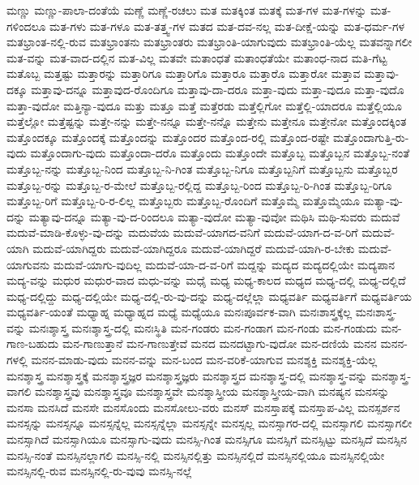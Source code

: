 {ಮಣ್ಣು
ಮಣ್ಣು-ಪಾಲಾ-ದಂತೆಯೆ
ಮಣ್ಣೆ
ಮಣ್ಣೆ-ರಚಲು
ಮತ
ಮತಕ್ಕಿಂತ
ಮತಕ್ಕೆ
ಮತ-ಗಳ
ಮತ-ಗಳನ್ನು
ಮತ-ಗಳಿಂದಲೂ
ಮತ-ಗಳು
ಮತ-ಗಳೂ
ಮತ-ತತ್ತ್ವ-ಗಳ
ಮತದ
ಮತ-ದವ-ನಲ್ಲ
ಮತ-ದೀಕ್ಷೆ-ಯನ್ನು
ಮತ-ಧರ್ಮ-ಗಳ
ಮತಭ್ರಾಂತ-ನಲ್ಲಿ-ರುವ
ಮತಭ್ರಾಂತನು
ಮತಭ್ರಾಂತರು
ಮತಭ್ರಾಂತಿ-ಯಾಗುವುದು
ಮತಭ್ರಾಂತಿ-ಯೆಲ್ಲ
ಮತವನ್ನಾಗಲೀ
ಮತ-ವನ್ನು
ಮತ-ವಾದ-ದಲ್ಲಿನ
ಮತ-ವಿಲ್ಲ
ಮತವೇ
ಮತಾಂಧತೆ
ಮತಾಂಧತೆಯೇ
ಮತಾಂಧ-ನಾದ
ಮತಿ-ಗೆಟ್ಟ
ಮತೊಬ್ಬ
ಮತ್ತಷ್ಟು
ಮತ್ತಾರನ್ನು
ಮತ್ತಾರಿಗೂ
ಮತ್ತಾರಿಗೊ
ಮತ್ತಾರೂ
ಮತ್ತಾರೊ
ಮತ್ತಾರೋ
ಮತ್ತಾವ
ಮತ್ತಾವು-ದಕ್ಕೂ
ಮತ್ತಾವು-ದನ್ನೂ
ಮತ್ತಾವುದ-ರೊಂದಿಗೂ
ಮತ್ತಾವು-ದಾ-ದರೂ
ಮತ್ತಾ-ವುದು
ಮತ್ತಾ-ವುದೂ
ಮತ್ತಾ-ವುದೊ
ಮತ್ತಾ-ವುದೋ
ಮತ್ತಿನ್ಯಾ-ವುದೂ
ಮತ್ತು
ಮತ್ತೂ
ಮತ್ತೆ
ಮತ್ತೆರಡು
ಮತ್ತೆಲ್ಲಿಗೋ
ಮತ್ತೆಲ್ಲಿ-ಯಾದರೂ
ಮತ್ತೆಲ್ಲಿಯೂ
ಮತ್ತೆಲ್ಲೋ
ಮತ್ತೆಷ್ಟನ್ನು
ಮತ್ತೇ-ನನ್ನು
ಮತ್ತೇ-ನನ್ನೂ
ಮತ್ತೇ-ನನ್ನೊ
ಮತ್ತೇನು
ಮತ್ತೇನೂ
ಮತ್ತೇನೋ
ಮತ್ತೊಂದಕ್ಕಿಂತ
ಮತ್ತೊಂದಕ್ಕೂ
ಮತ್ತೊಂದಕ್ಕೆ
ಮತ್ತೊಂದನ್ನು
ಮತ್ತೊಂದರ
ಮತ್ತೊಂದ-ರಲ್ಲಿ
ಮತ್ತೊಂದ-ರಷ್ಟೇ
ಮತ್ತೊಂದಾಗುತ್ತಿ-ರು-ವುದು
ಮತ್ತೊಂದಾಗು-ವುದು
ಮತ್ತೊಂದಾ-ದರೊ
ಮತ್ತೊಂದು
ಮತ್ತೊಂದೇ
ಮತ್ತೊಬ್ಬ
ಮತ್ತೊಬ್ಬನ
ಮತ್ತೊಬ್ಬ-ನಂತೆ
ಮತ್ತೊಬ್ಬ-ನನ್ನು
ಮತ್ತೊಬ್ಬ-ನಿಂದ
ಮತ್ತೊಬ್ಬ-ನಿ-ಗಿಂತ
ಮತ್ತೊಬ್ಬ-ನಿಗೂ
ಮತ್ತೊಬ್ಬನಿಗೆ
ಮತ್ತೊಬ್ಬನು
ಮತ್ತೊಬ್ಬರ
ಮತ್ತೊಬ್ಬ-ರನ್ನು
ಮತ್ತೊಬ್ಬ-ರ-ಮೇಲೆ
ಮತ್ತೊಬ್ಬ-ರಲ್ಲಿದ್ದ
ಮತ್ತೊಬ್ಬ-ರಿಂದ
ಮತ್ತೊಬ್ಬ-ರಿ-ಗಿಂತ
ಮತ್ತೊಬ್ಬ-ರಿಗೂ
ಮತ್ತೊಬ್ಬ-ರಿಗೆ
ಮತ್ತೊಬ್ಬ-ರಿ-ರ-ಲಿಲ್ಲ
ಮತ್ತೊಬ್ಬರು
ಮತ್ತೊಬ್ಬ-ರೊಂದಿಗೆ
ಮತ್ತೊಮ್ಮೆ
ಮತ್ತೊಮ್ಮೆಯೂ
ಮತ್ಯಾ-ವು-ದನ್ನು
ಮತ್ಯಾವು-ದನ್ನೂ
ಮತ್ಯಾ-ವು-ದ-ರಿಂದಲೂ
ಮತ್ಯಾ-ವುದೋ
ಮತ್ಯಾ-ವುವೋ
ಮಥಿಸಿ
ಮಥಿ-ಸುವರು
ಮದುವೆ
ಮದುವೆ-ಮಾಡಿ-ಕೊಳ್ಳು-ವು-ದನ್ನು
ಮದುವೆಯ
ಮದುವೆ-ಯಾಗದ-ವನಿಗೆ
ಮದುವೆ-ಯಾಗ-ದ-ವ-ರಿಗೆ
ಮದುವೆ-ಯಾಗಿ
ಮದುವೆ-ಯಾಗಿದ್ದರು
ಮದುವೆ-ಯಾಗಿದ್ದರೂ
ಮದುವೆ-ಯಾಗಿದ್ದರೆ
ಮದುವೆ-ಯಾಗಿ-ರ-ಬೇಕು
ಮದುವೆ-ಯಾಗುವನು
ಮದುವೆ-ಯಾಗು-ವುದಿಲ್ಲ
ಮದುವೆ-ಯಾ-ದ-ವ-ರಿಗೆ
ಮದ್ದನ್ನು
ಮದ್ಯದ
ಮದ್ಯದಲ್ಲಿಯೇ
ಮದ್ಯಪಾನ
ಮದ್ಯ-ವನ್ನು
ಮಧುರ
ಮಧುರ-ವಾದ
ಮಧು-ವನ್ನು
ಮಧೈ
ಮಧ್ಯ
ಮಧ್ಯ-ಕಾಲದ
ಮಧ್ಯದ
ಮಧ್ಯ-ದಲ್ಲಿ
ಮಧ್ಯ-ದಲ್ಲಿದೆ
ಮಧ್ಯ-ದಲ್ಲಿದ್ದು
ಮಧ್ಯ-ದಲ್ಲಿಯೇ
ಮಧ್ಯ-ದಲ್ಲಿ-ರು-ವು-ದನ್ನು
ಮಧ್ಯ-ದಲ್ಲೆಲ್ಲಾ
ಮಧ್ಯವರ್ತಿ
ಮಧ್ಯವರ್ತಿಗೆ
ಮಧ್ಯವರ್ತಿಯ
ಮಧ್ಯವರ್ತಿ-ಯಂತೆ
ಮಧ್ಯಾಹ್ನ
ಮಧ್ಯಾಹ್ನದ
ಮಧ್ಯೆ
ಮಧ್ಯೆಯೂ
ಮನಃಪೂರ್ವಕ-ವಾಗಿ
ಮನಃಶಾಸ್ತ್ರಕ್ಕೆಲ್ಲ
ಮನಃಶಾಸ್ತ್ರ-ವನ್ನು
ಮನಃಶ್ಶಾಸ್ತ್ರ
ಮನಃಶ್ಶಾಸ್ತ್ರ-ದಲ್ಲಿ
ಮನಃಸ್ಥಿತಿ
ಮನ-ಗಂಡರು
ಮನ-ಗಂಡಾಗ
ಮನ-ಗಂಡು
ಮನ-ಗಂಡುದು
ಮನ-ಗಾಣ-ಬಹುದು
ಮನ-ಗಾಣುತ್ತಾನೆ
ಮನ-ಗಾಣುತ್ತೇವೆ
ಮನದ
ಮನದಟ್ಟಾಗು-ವುದೋ
ಮನ-ದಣಿಯೆ
ಮನನ
ಮನನ-ಗಳಲ್ಲಿ
ಮನನ-ಮಾಡು-ವುದು
ಮನನ-ವನ್ನು
ಮನ-ಬಂದ
ಮನ-ವರಿಕೆ-ಯಾಗುವ
ಮನಶ್ಶಕ್ತಿ
ಮನಶ್ಶಕ್ತಿ-ಯೆಲ್ಲ
ಮನಶ್ಶಾಸ್ತ್ರ
ಮನಶ್ಶಾಸ್ತ್ರಕ್ಕೆ
ಮನಶ್ಶಾಸ್ತ್ರಜ್ಞರ
ಮನಶ್ಶಾಸ್ತ್ರಜ್ಞರು
ಮನಶ್ಶಾಸ್ತ್ರದ
ಮನಶ್ಶಾಸ್ತ್ರ-ದಲ್ಲಿ
ಮನಶ್ಶಾಸ್ತ್ರ-ವನ್ನು
ಮನಶ್ಶಾಸ್ತ್ರ-ವಾಗಲಿ
ಮನಶ್ಶಾಸ್ತ್ರವು
ಮನಶ್ಶಾಸ್ತ್ರವೂ
ಮನಶ್ಶಾಸ್ತ್ರವೇ
ಮನಶ್ಶಾಸ್ತ್ರೀಯ
ಮನಶ್ಶಾಸ್ತ್ರೀಯ-ವಾಗಿ
ಮನಷ್ಯನ
ಮನಸನ್ನು
ಮನಸಾ
ಮನಸಿದೆ
ಮನಸೇ
ಮನಸೊಂದು
ಮನಸೋಲು-ವರು
ಮನಸ್
ಮನಸ್ತಾಪಕ್ಕೆ
ಮನಸ್ತಾಪ-ವಿಲ್ಲ
ಮನಸ್ಪರ್ಶನ
ಮನಸ್ಸನ್ನು
ಮನಸ್ಸನ್ನೂ
ಮನಸ್ಸನ್ನೆಲ್ಲ
ಮನಸ್ಸನ್ನೆಲ್ಲಾ
ಮನಸ್ಸನ್ನೇ
ಮನಸ್ಸಲ್ಲ
ಮನಸ್ಸಾಗರ-ದಲ್ಲಿ
ಮನಸ್ಸಾಗಲಿ
ಮನಸ್ಸಾಗಲೀ
ಮನಸ್ಸಾಗಿದೆ
ಮನಸ್ಸಾಗಿಯೂ
ಮನಸ್ಸಾಗು-ವುದು
ಮನಸ್ಸಿ-ಗಿಂತ
ಮನಸ್ಸಿಗೂ
ಮನಸ್ಸಿಗೆ
ಮನಸ್ಸಿಟ್ಟು
ಮನಸ್ಸಿದೆ
ಮನಸ್ಸಿನ
ಮನಸ್ಸಿ-ನಂತೆ
ಮನಸ್ಸಿನಲ್ಲಾಗಲಿ
ಮನಸ್ಸಿ-ನಲ್ಲಿ
ಮನಸ್ಸಿನಲ್ಲಿತ್ತು
ಮನಸ್ಸಿನಲ್ಲಿದೆ
ಮನಸ್ಸಿನಲ್ಲಿಯೂ
ಮನಸ್ಸಿನಲ್ಲಿಯೇ
ಮನಸ್ಸಿನಲ್ಲಿ-ರುವ
ಮನಸ್ಸಿನಲ್ಲಿ-ರು-ವುವು
ಮನಸ್ಸಿ-ನಲ್ಲೆ
}
